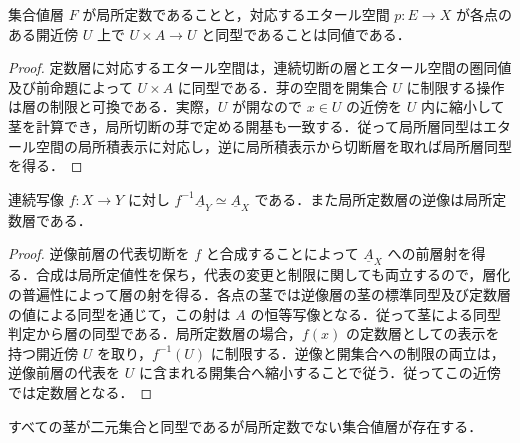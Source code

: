 \begin{prop}[エタール空間による局所定数性]
集合値層 $F$ が局所定数であることと，対応するエタール空間 $p:E\to X$ が各点のある開近傍 $U$ 上で $U\times A\to U$ と同型であることは同値である．
\end{prop}
\begin{proof}
定数層に対応するエタール空間は，連続切断の層とエタール空間の圏同値及び前命題によって $U\times A$ に同型である．芽の空間を開集合 $U$ に制限する操作は層の制限と可換である．実際，$U$ が開なので $x\in U$ の近傍を $U$ 内に縮小して茎を計算でき，局所切断の芽で定める開基も一致する．従って局所層同型はエタール空間の局所積表示に対応し，逆に局所積表示から切断層を取れば局所層同型を得る．
\end{proof}
\begin{prop}[逆像による局所定数性の保存]
連続写像 $f:X\to Y$ に対し $f^{-1}\underline A_Y\simeq\underline A_X$ である．また局所定数層の逆像は局所定数層である．
\end{prop}
\begin{proof}
逆像前層の代表切断を $f$ と合成することによって $\underline A_X$ への前層射を得る．合成は局所定値性を保ち，代表の変更と制限に関しても両立するので，層化の普遍性によって層の射を得る．各点の茎では逆像層の茎の標準同型及び定数層の値による同型を通じて，この射は $A$ の恒等写像となる．従って茎による同型判定から層の同型である．局所定数層の場合，$f(x)$ の定数層としての表示を持つ開近傍 $U$ を取り，$f^{-1}(U)$ に制限する．逆像と開集合への制限の両立は，逆像前層の代表を $U$ に含まれる開集合へ縮小することで従う．従ってこの近傍では定数層となる．
\end{proof}
\begin{example}[茎の濃度だけでは局所定数性は従わない]
すべての茎が二元集合と同型であるが局所定数でない集合値層が存在する．
\end{example}
